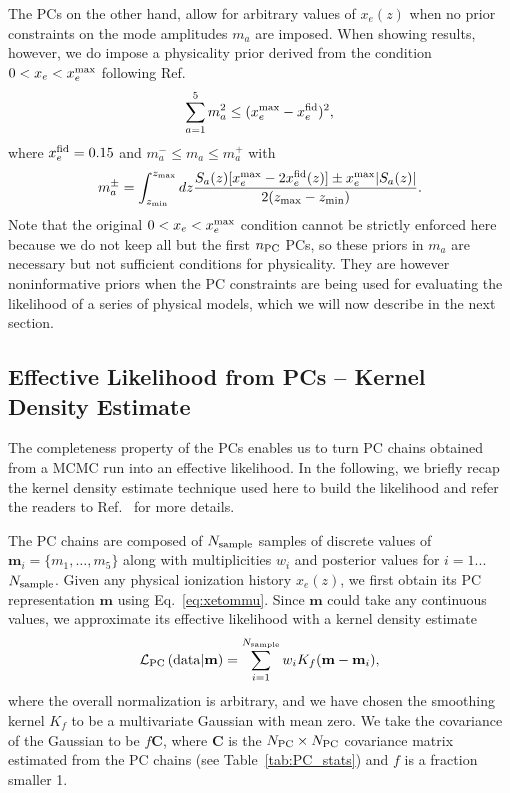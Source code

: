 \documentclass[prd,twocolumn,amsmath,amssymb,floatfix,superscriptaddress,nofootinbib]{revtex4-1}
\newcommand{\beq}{\begin{equation}}
\newcommand{\eeq}{\end{equation}}
\begin{document}
The PCs on the other hand, allow for arbitrary values of $x_e(z)$ when no prior constraints on the mode amplitudes $m_a$ are imposed. When showing results, however, we do impose a physicality prior derived from the condition $0<x_e<x_e^{\rm max}$ following Ref.~\cite{Mortonson:2008rx}
%
\begin{equation}
\sum_{a=1}^5 m_a^2 \le (x_e^{\rm max}-x_e^{\rm fid})^2,
\end{equation}
where $x_e^{\rm fid}=0.15$ and $m_a^{-} \le m_a \le m_a^{+}$ with
\begin{equation}
m_a^{\pm} = \int_{z_{\rm min}}^{z_{\rm max} } dz \frac{S_a(z)[x_e^{\rm max} -2 x_e^{\rm fid}(z)]
\pm x_e^{\rm max} | S_a(z)|}{2(z_{\rm max}-z_{\rm min})}.
\label{eq:individualprior}
\end{equation}
%
Note that the original $0<x_e<x_e^{\rm max}$ condition cannot be strictly enforced here because we do not keep all but the first $n_{\rm PC}$ PCs, so these priors in $m_a$ are necessary but not sufficient conditions for physicality. They are however noninformative priors when the PC constraints are being used for evaluating the likelihood of a series of physical models, which we will now describe in the next section.


\subsection{Effective Likelihood from PCs -- Kernel Density Estimate}
\label{sec:KDE}

The completeness property of the PCs enables us to turn PC chains obtained from a MCMC run into an effective likelihood. In the following, we briefly recap the kernel density estimate technique used here to build the likelihood and refer the readers to Ref.~\cite{Heinrich:2016ojb} for more details.

The PC chains are composed of $N_{\rm sample}$ samples of discrete values of $\mathbf{m}_i = \{m_1, \ldots, m_5\}$ along with multiplicities $w_i$ and posterior values for $i = 1$...$N_{\rm sample}$. Given any physical ionization history $x_e(z)$, we first obtain its PC representation $\mathbf{m}$ using Eq.~\ref{eq:xetommu}. Since $\mathbf{m}$ could take any continuous values, we approximate its effective likelihood with a kernel density estimate
\beq
{\cal L}_{\rm PC}\left({\rm data}|\mathbf{m} \right)  = \sum_{i = 1}^{N_{\rm sample}} w_i K_f(\mathbf{m}-\mathbf{m}_i),
\eeq
where the overall normalization is arbitrary, and we have chosen the smoothing kernel $K_f$ to be a  multivariate Gaussian with mean zero. We take the covariance of the Gaussian to be $f\mathbf{C}$, where $\mathbf{C}$ is the $N_{\rm PC} \times N_{\rm PC}$ covariance matrix estimated from the PC chains (see Table~\ref{tab:PC_stats}) and $f$ is a fraction smaller 1.
\end{document}
